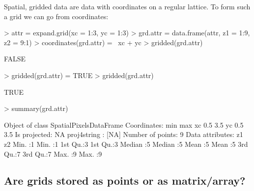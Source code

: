 \documentclass{article}
\begin{document}
Spatial, gridded data are data with coordinates on a regular lattice.
To form such a grid we can go from coordinates:
\begin{Schunk}
\begin{Sinput}
> attr = expand.grid(xc = 1:3, yc = 1:3)
> grd.attr = data.frame(attr, z1 = 1:9, z2 = 9:1)
> coordinates(grd.attr) = ~xc + yc
> gridded(grd.attr)
\end{Sinput}
\begin{Soutput}
[1] FALSE
\end{Soutput}
\begin{Sinput}
> gridded(grd.attr) = TRUE
> gridded(grd.attr)
\end{Sinput}
\begin{Soutput}
[1] TRUE
\end{Soutput}
\begin{Sinput}
> summary(grd.attr)
\end{Sinput}
\begin{Soutput}
Object of class SpatialPixelsDataFrame
Coordinates:
   min max
xc 0.5 3.5
yc 0.5 3.5
Is projected: NA 
proj4string : [NA]
Number of points: 9
Data attributes:
       z1          z2   
 Min.   :1   Min.   :1  
 1st Qu.:3   1st Qu.:3  
 Median :5   Median :5  
 Mean   :5   Mean   :5  
 3rd Qu.:7   3rd Qu.:7  
 Max.   :9   Max.   :9  
\end{Soutput}
\end{Schunk}

\subsection{Are grids stored as points or as matrix/array?}
\end{document}
